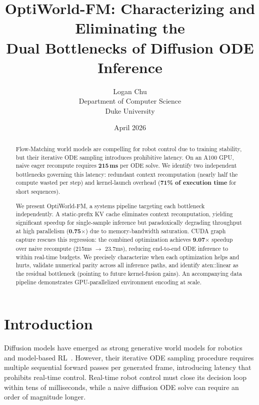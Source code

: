 \documentclass[letterpaper,twocolumn,10pt]{article}
\title{\textbf{OptiWorld-FM}: Characterizing and Eliminating the\\
Dual Bottlenecks of Diffusion ODE Inference}
\author{
Logan Chu\\
Department of Computer Science\\
Duke University
}
\date{April 2026}
\begin{document}
\maketitle

\begin{abstract}

Flow-Matching world models are compelling for robot control due to
training stability, but their iterative ODE sampling introduces prohibitive latency.
On an A100 GPU, naive eager recompute requires \textbf{215\,ms} per ODE solve.
We identify two independent bottlenecks governing this latency: redundant context recomputation
(nearly half the compute wasted per step) and kernel-launch overhead
(\textbf{71\% of execution time} for short sequences).

We present OptiWorld-FM, a systems pipeline targeting each bottleneck independently.
A static-prefix KV cache eliminates context recomputation, yielding significant speedup
for single-sample inference but paradoxically degrading throughput at high parallelism
(\textbf{0.75$\times$}) due to memory-bandwidth saturation.  CUDA graph capture rescues this regression:
the combined optimization achieves \textbf{9.07$\times$} speedup over naive recompute
(215ms $\to$ 23.7ms), reducing end-to-end ODE inference to within real-time budgets.
We precisely characterize when each optimization helps and hurts, validate numerical parity
across all inference paths, and identify aten::linear as the residual bottleneck
(pointing to future kernel-fusion gains).  An accompanying data pipeline demonstrates
GPU-parallelized environment encoding at scale.

\end{abstract}

\section{Introduction}

Diffusion models have emerged as strong generative world models for
robotics and model-based RL~\cite{ho2020ddpm,song2021sde,lipman2023flow}.
However, their iterative ODE sampling procedure requires multiple sequential forward
passes per generated frame, introducing latency that prohibits real-time control.
Real-time robot control must close its decision loop within tens of milliseconds,
while a naive diffusion ODE solve can require an order of magnitude longer.
\end{document}
